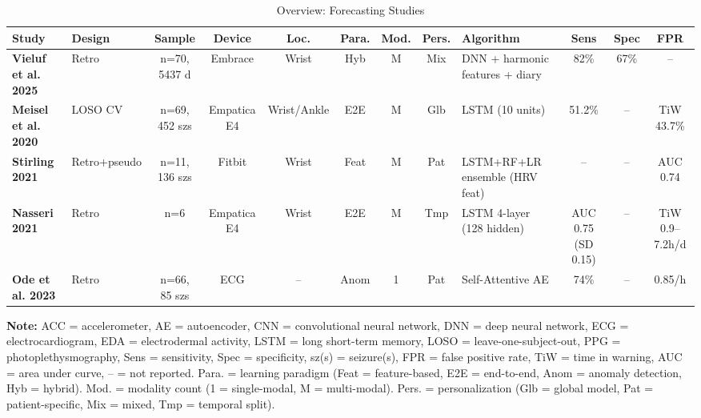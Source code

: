 
\begin{landscape}
\begin{table}[htbp]
\centering
\footnotesize
\caption{Overview: Forecasting Studies}
\label{tab:forecasting-matrix}
\setlength{\tabcolsep}{3pt}
\renewcommand{\arraystretch}{1.3}
\begin{tabularx}{\linewidth}{@{} l X c c c c c c X c c c @{}}
\toprule
\textbf{Study} & \textbf{Design} & \textbf{Sample} & \textbf{Device} & \textbf{Loc.} & \textbf{Para.} & \textbf{Mod.} & \textbf{Pers.} & \textbf{Algorithm} & \textbf{Sens} & \textbf{Spec} & \textbf{FPR} \\
\midrule
\textbf{Vieluf et al. 2025} & Retro & n=70, 5437 d & Embrace & Wrist & Hyb & M & Mix & DNN + harmonic features + diary & 82\% & 67\% & -- \\
\addlinespace
\textbf{Meisel et al. 2020} & LOSO CV & n=69, 452 szs & Empatica E4 & Wrist/Ankle & E2E & M & Glb & LSTM (10 units) & 51.2\% & -- & TiW 43.7\% \\
\addlinespace
\textbf{Stirling 2021} & Retro+pseudo & n=11, 136 szs & Fitbit & Wrist & Feat & M & Pat & LSTM+RF+LR ensemble (HRV feat) & -- & -- & AUC 0.74 \\
\addlinespace
\textbf{Nasseri 2021} & Retro & n=6 & Empatica E4 & Wrist & E2E & M & Tmp & LSTM 4-layer (128 hidden) & AUC 0.75 (SD 0.15) & -- & TiW 0.9--7.2h/d \\
\addlinespace
\textbf{Ode et al. 2023} & Retro & n=66, 85 szs & ECG & -- & Anom & 1 & Pat & Self-Attentive AE & 74\% & -- & 0.85/h \\
\bottomrule
\end{tabularx}
\par\medskip
\scriptsize
\textbf{Note:} ACC = accelerometer, AE = autoencoder, CNN = convolutional neural network, DNN = deep neural network, ECG = electrocardiogram, EDA = electrodermal activity, LSTM = long short-term memory, LOSO = leave-one-subject-out, PPG = photoplethysmography, Sens = sensitivity, Spec = specificity, sz(s) = seizure(s), FPR = false positive rate, TiW = time in warning, AUC = area under curve, -- = not reported. Para. = learning paradigm (Feat = feature-based, E2E = end-to-end, Anom = anomaly detection, Hyb = hybrid). Mod. = modality count (1 = single-modal, M = multi-modal). Pers. = personalization (Glb = global model, Pat = patient-specific, Mix = mixed, Tmp = temporal split).
\end{table}
\end{landscape}
